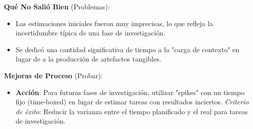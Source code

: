 \textbf{Qué No Salió Bien} (Problemas):
\begin{itemize}
    \item Las estimaciones iniciales fueron muy imprecisas, lo que refleja la incertidumbre típica de una fase de investigación.
    \item Se dedicó una cantidad significativa de tiempo a la "carga de contexto" en lugar de a la producción de artefactos tangibles.
\end{itemize}

\textbf{Mejoras de Proceso} (Probar):
\begin{itemize}
    \item \textbf{Acción}: Para futuras fases de investigación, utilizar "spikes" con un tiempo fijo (time-boxed) en lugar de estimar tareas con resultados inciertos. \textit{Criterio de éxito}: Reducir la varianza entre el tiempo planificado y el real para tareas de investigación.
\end{itemize}
